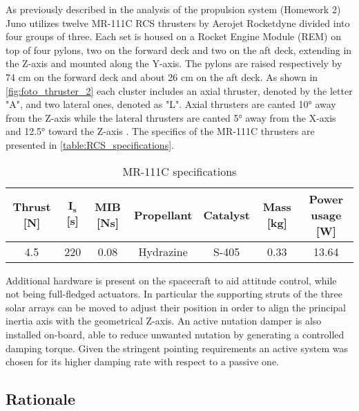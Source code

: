 As previously described in the analysis of the propulsion system (Homework 2) Juno utilizes twelve MR-111C RCS thrusters by Aerojet Rocketdyne \cite{RCS_info} divided into four groups of three.
Each set is housed on a Rocket Engine Module (REM) on top of four pylons, two on the forward deck and two on the aft deck, extending in the Z-axis and mounted along the Y-axis.
The pylons are raised respectively by 74 cm on the forward deck and about 26 cm on the aft deck. As shown in \autoref{fig:foto_thruster_2} each cluster includes an axial thruster, denoted by the letter "A", and two lateral ones, denoted as "L".
Axial thrusters are canted 10° away from the Z-axis while the lateral thrusters are canted 5° away from the X-axis and 12.5° toward the Z-axis \cite{juno_inner}. The specifics of the MR-111C thrusters are presented in \autoref{table:RCS_specifications}. \cite{RCS_values}

\begin{table}[H]
    \renewcommand{\arraystretch}{1.3}
    \centering
    \small
    \begin{tabular}{|c|c|c|c|c|c|c|}
        \hline
        \textbf{Thrust [N]} & \textbf{$\boldsymbol{I_{s}}$ [s]} & \textbf{MIB [Ns]} & \textbf{Propellant} & \textbf{Catalyst} & \textbf{Mass [kg]} & \textbf{Power usage [W]} \\
        \hline
        \hline
        4.5 & 220 & 0.08 & Hydrazine & S-405 & 0.33 & 13.64 \\
        \hline
    \end{tabular}
    \caption{MR-111C specifications}
    \label{table:RCS_specifications}
\end{table}

Additional hardware is present on the spacecraft to aid attitude control, while not being full-fledged actuators. In particular the supporting struts of the three solar arrays can be moved to adjust their position in order to align the principal inertia axis with the geometrical Z-axis. \cite{LL_early_cruise} An active nutation damper is also installed on-board, able to reduce unwanted nutation by generating a controlled damping torque. \cite{juno_sito} Given the stringent pointing requirements an active system was chosen for its higher damping rate with respect to a passive one.   

\subsection{Rationale}
\label{subsec:Rationale}

